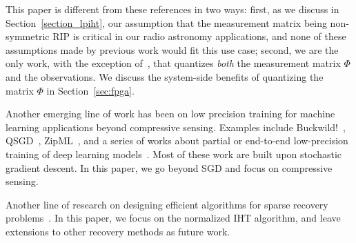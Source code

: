 \documentclass{article}
\begin{document}
{This paper is different from these references
in two ways: first, as we discuss in Section~\ref{section_lpiht},
our assumption that the measurement matrix being
non-symmetric RIP is critical in our radio astronomy applications, 
and none of these assumptions made by previous work would fit  this use case; second, we are the only work,
with the exception of~\cite{gopi20131bitcs}, that quantizes
{\em both} the measurement matrix $\Phi$ and the observations.
We discuss the system-side benefits  
of quantizing the matrix $\Phi$ in Section~\ref{sec:fpga}.
} 



Another emerging line of work has been on low precision training for 
machine learning applications beyond compressive
sensing. Examples include Buckwild!~\cite{desa2015hogwild},
QSGD~\cite{alistarh2016qsgd},  
ZipML~\cite{zhang2017zipml}, and
a series of works about 
partial or end-to-end low-precision training 
of deep learning models~\cite{seide2014sgd1bit, hubara2016qsnn, rastegari2016binarycnn,zhou2016cnn, miyashita2016cnn, li2016twn, gupta2015dl}.
Most of these work are built upon stochastic gradient descent. In this paper, we 
go beyond SGD and focus on  compressive sensing.



Another line of research on 
designing efficient algorithms for sparse recovery problems~\cite{blumensath2011aiht, wei2015fiht, blanchard2013iht, cevher2011ht, liu2017dualiht}. In this paper, we focus on the normalized IHT algorithm, and leave extensions to other recovery methods as future work.




\vspace{-1em}
\end{document}

